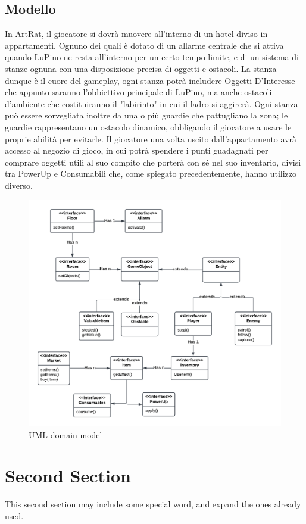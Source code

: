 \documentclass[a4paper,12pt]{report}
\begin{document}
\section{Modello }
In ArtRat, il giocatore si dovrà muovere all'interno di un hotel diviso in appartamenti. Ognuno dei quali è dotato di un allarme centrale che si attiva quando LuPino ne resta all'interno per un certo tempo limite, e di un sistema di stanze ognuna con una disposizione precisa di oggetti e ostacoli.
La stanza dunque è il cuore del gameplay, ogni stanza potrà includere Oggetti D'Interesse che appunto saranno l'obbiettivo principale di LuPino, ma anche ostacoli d'ambiente che costituiranno il "labirinto" in cui il ladro si aggirerà.
Ogni stanza può essere sorvegliata inoltre da una o più guardie che pattugliano la zona; le guardie rappresentano un ostacolo dinamico, obbligando il giocatore a usare le proprie abilità per evitarle.
Il giocatore una volta uscito dall'appartamento avrà accesso al negozio di gioco, in cui potrà spendere i punti guadagnati per comprare oggetti utili al suo compito che porterà con sé nel suo inventario, divisi tra PowerUp e Consumabili che, come spiegato precedentemente, hanno utilizzo diverso.

\begin{figure}[H] %
    \centering
    \includegraphics[width=0.9\linewidth]{UML domain model.png}
    \caption{UML domain model}
    \label{fig:enter-label}
\end{figure}

\clearpage

\chapter{Second Section}
This second section may include some special 
word, and expand the ones already used.
\end{document}
